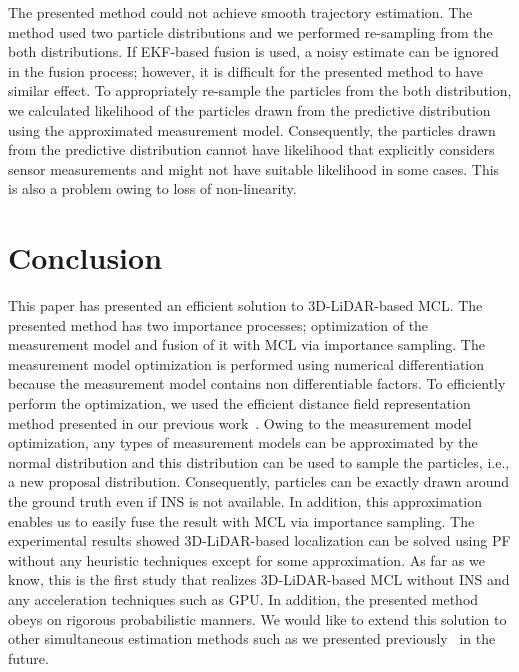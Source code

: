 \documentclass[letterpaper, 10 pt, conference]{ieeeconf}  %
\begin{document}
The presented method could not achieve smooth trajectory estimation.
The method used two particle distributions and we performed re-sampling from the both distributions.
If EKF-based fusion is used, a noisy estimate can be ignored in the fusion process; however, it is difficult for the presented method to have similar effect.
To appropriately re-sample the particles from the both distribution, we calculated likelihood of the particles drawn from the predictive distribution using the approximated measurement model.
Consequently, the particles drawn from the predictive distribution cannot have likelihood that explicitly considers sensor measurements and might not have suitable likelihood in some cases.
This is also a problem owing to loss of non-linearity.


















\section{Conclusion}
\label{sec:conclusion}

This paper has presented an efficient solution to 3D-LiDAR-based MCL.
The presented method has two importance processes; optimization of the measurement model and fusion of it with MCL via importance sampling.
The measurement model optimization is performed using numerical differentiation because the measurement model contains non differentiable factors.
To efficiently perform the optimization, we used the efficient distance field representation method presented in our previous work~\cite{AkaiIV2020}.
Owing to the measurement model optimization, any types of measurement models can be approximated by the normal distribution and this distribution can be used to sample the particles, i.e., a new proposal distribution.
Consequently, particles can be exactly drawn around the ground truth even if INS is not available.
In addition, this approximation enables us to easily fuse the result with MCL via importance sampling.
The experimental results showed 3D-LiDAR-based localization can be solved using PF without any heuristic techniques except for some approximation.
As far as we know, this is the first study that realizes 3D-LiDAR-based MCL without INS and any acceleration techniques such as GPU.
In addition, the presented method obeys on rigorous probabilistic manners.
We would like to extend this solution to other simultaneous estimation methods such as we presented previously~\cite{AkaiJFR2023} in the future.
\end{document}

